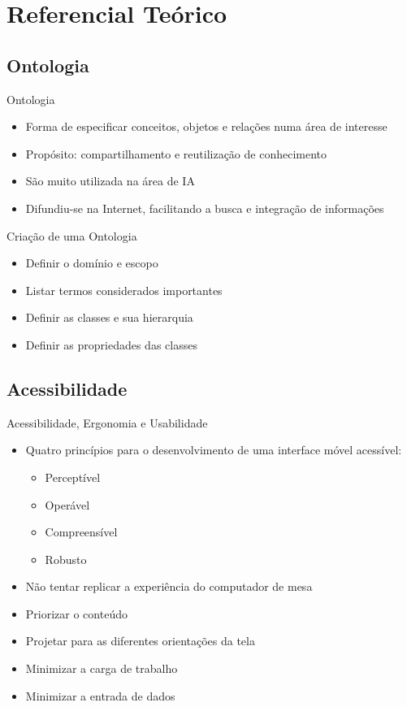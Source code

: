 \section{Referencial Teórico}\label{sec:referencial-teorico}

\subsection{Ontologia}
\begin{frame}{Ontologia}
	\begin{itemize}
		\setlength{\itemsep}{1em}
		\item<1-> Forma de especificar conceitos, objetos e relações numa área de interesse
		\item<1-> Propósito: compartilhamento e reutilização de conhecimento
		\item<1-> São muito utilizada na área de IA
		\item<1-> Difundiu-se na Internet, facilitando a busca e integração de informações
	\end{itemize}
\end{frame}

\begin{frame}{Criação de uma Ontologia}
	\begin{itemize}
		\setlength{\itemsep}{1em}
		\item<1-> Definir o domínio e escopo
		\item<1-> Listar termos considerados importantes
		\item<1-> Definir as classes e sua hierarquia
		\item<1-> Definir as propriedades das classes
	\end{itemize}
\end{frame}

\subsection{Acessibilidade}
\begin{frame}[allowframebreaks]{Acessibilidade, Ergonomia e Usabilidade}
	\begin{itemize}
		\setlength{\itemsep}{1em}
		\item<1-> Quatro princípios para o desenvolvimento de uma interface móvel acessível:
		\begin{itemize}
			\setlength{\itemsep}{0.5em}
			\item<1-> Perceptível
			\item<1-> Operável
			\item<1-> Compreensível
			\item<1-> Robusto
		\end{itemize}
		\item<1-> Não tentar replicar a experiência do computador de mesa
		\framebreak
		\item<1-> Priorizar o conteúdo
		\item<1-> Projetar para as diferentes orientações da tela
		\item<1-> Minimizar a carga de trabalho
		\item<1-> Minimizar a entrada de dados
	\end{itemize}
\end{frame}

